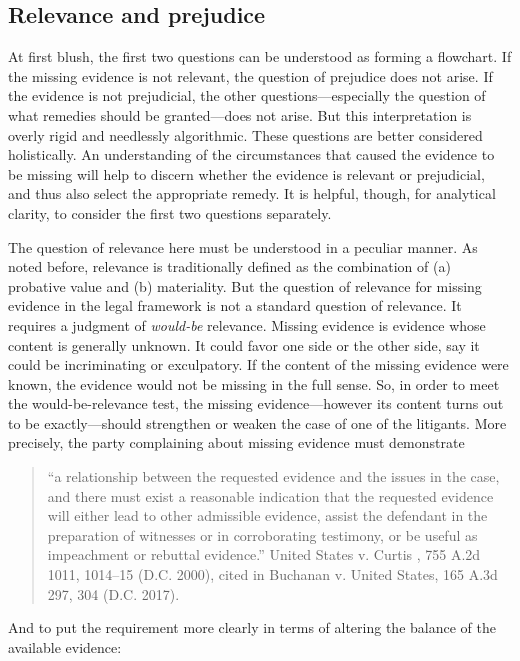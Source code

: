 \documentclass[
  10pt,
  dvipsnames,enabledeprecatedfontcommands]{scrartcl}
\begin{document}
\hypertarget{relevance-and-prejudice}{%
\subsection{Relevance and prejudice}\label{relevance-and-prejudice}}

At first blush, the first two questions can be understood as forming a
flowchart. If the missing evidence is not relevant, the question of
prejudice does not arise. If the evidence is not prejudicial, the other
questions---especially the question of what remedies should be
granted---does not arise. But this interpretation is overly rigid and
needlessly algorithmic. These questions are better considered
holistically. An understanding of the circumstances that caused the
evidence to be missing will help to discern whether the evidence is
relevant or prejudicial, and thus also select the appropriate remedy. It
is helpful, though, for analytical clarity, to consider the first two
questions separately.

The question of relevance here must be understood in a peculiar manner.
As noted before, relevance is traditionally defined as the combination
of (a) probative value and (b) materiality. But the question of
relevance for missing evidence in the legal framework is not a standard
question of relevance. It requires a judgment of \textit{would-be}
relevance. Missing evidence is evidence whose content is generally
unknown. It could favor one side or the other side, say it could be
incriminating or exculpatory. If the content of the missing evidence
were known, the evidence would not be missing in the full sense. So, in
order to meet the would-be-relevance test, the missing
evidence---however its content turns out to be exactly---should
strengthen or weaken the case of one of the litigants. More precisely,
the party complaining about missing evidence must demonstrate

\begin{quote}
``a relationship between the requested evidence and the issues in the
case, and there must exist a reasonable indication that the requested
evidence will either lead to other admissible evidence, assist the
defendant in the preparation of witnesses or in corroborating testimony,
or be useful as impeachment or rebuttal evidence.'' United States v.
Curtis , 755 A.2d 1011, 1014--15 (D.C. 2000), cited in Buchanan v.
United States, 165 A.3d 297, 304 (D.C. 2017).
\end{quote}

\noindent And to put the requirement more clearly in terms of altering
the balance of the available evidence:
\end{document}
